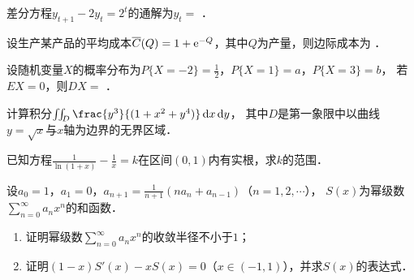 \documentclass[plain,noanswer,medmath]{../../template/jnuexam}
\begin{document}
\begin{problem}
差分方程$y_{t + 1} - 2y_t = 2^t$的通解为$y_t =$ \fillin{}．
\end{problem}


\begin{problem}
设生产某产品的平均成本$\overline{C} (Q) = 1 + \mathrm{e}^{- Q}$，其中$Q$为产量，则边际成本为 \fillin{}．
\end{problem}






\begin{problem}
设随机变量$X$的概率分布为$P\{X = - 2\} = \frac{1}{2}$，$P\{X = 1\} = a$，$P\{X = 3\} = b$，
若$EX = 0$，则$DX =$ \fillin{}．
\end{problem}






\begin{problem}[points=10]
计算积分$\iint_D \frac{y^3}{(1 + x^2 + y^4)} \dx\dy$，
其中$D$是第一象限中以曲线$y = \sqrt{x}$与$x$轴为边界的无界区域．
\end{problem}




\begin{problem}[points=10]
已知方程$\frac{1}{\ln(1 + x)} - \frac{1}{x} = k$在区间$(0,1)$内有实根，求$k$的范围．
\end{problem}


\begin{problem}[points=10]
设$a_0 = 1$，$a_1 = 0$，$a_{n + 1} = \frac{1}{n + 1}(na_n + a_{n - 1})$（$n = 1,2, \cdots$），
$S(x)$为幂级数$\sum_{n = 0}^{\infty}a_n x^n$的和函数．
\begin{enumerate}
\item 证明幂级数$\sum_{n = 0}^{\infty}a_n x^n$的收敛半径不小于$1$；
\item 证明$(1 - x)S'(x) - xS(x) = 0$（$x \in(- 1,1)$），并求$S(x)$的表达式．
\end{enumerate}
\end{problem}








\end{document}
